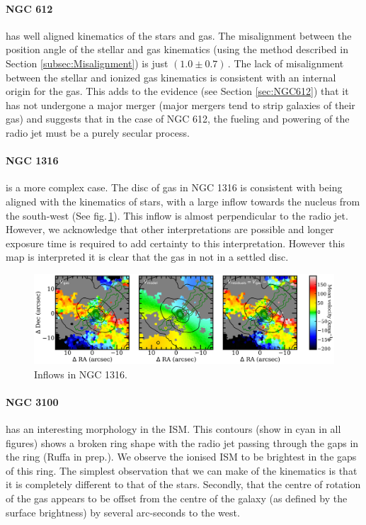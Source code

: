 	\paragraph{NGC 612} has well aligned kinematics of the stars and gas. The misalignment between the position angle of the stellar and gas kinematics (using the method described in Section \ref{subsec:Misalignment}) is just $(1.0\pm0.7)$\,\degree. The lack of misalignment between the stellar and ionized gas kinematics is consistent with an internal origin for the gas. This adds to the evidence (see Section \ref{sec:NGC612}) that it has not undergone a major merger (major mergers tend to strip galaxies of their gas) and suggests that in the case of NGC 612, the fueling and powering of the radio jet must be a purely secular process. 


	\paragraph{NGC 1316} is a more complex case. The disc of gas in NGC 1316 is consistent with being aligned with the kinematics of stars, with a large inflow towards the nucleus from the south-west (See fig.\,\ref{fig:Inflow}). This inflow is almost perpendicular to the radio jet. However, we acknowledge that other interpretations are possible and longer exposure time is required to add certainty to this interpretation. However this map is interpreted it is clear that the gas in not in a settled disc. 

	\begin{figure}
		\centering
		\includegraphics[width=\textwidth]{chapter5/ngc1316_inflow.png}
		\caption[Inflows in NGC 1316]{Inflows in NGC 1316.} 
		\label{fig:Inflow}
	\end{figure}


	\paragraph{NGC 3100} has an interesting morphology in the ISM. This  contours (show in cyan in all figures) shows a broken ring shape with the radio jet passing through the gaps in the ring (Ruffa in prep.). We observe the ionised ISM to be brightest in the gaps of this ring. The simplest observation that we can make of the kinematics is that it is completely different to that of the stars. Secondly, that the centre of rotation of the gas appears to be offset from the centre of the galaxy (as defined by the surface brightness) by several arc-seconds to the west. 


